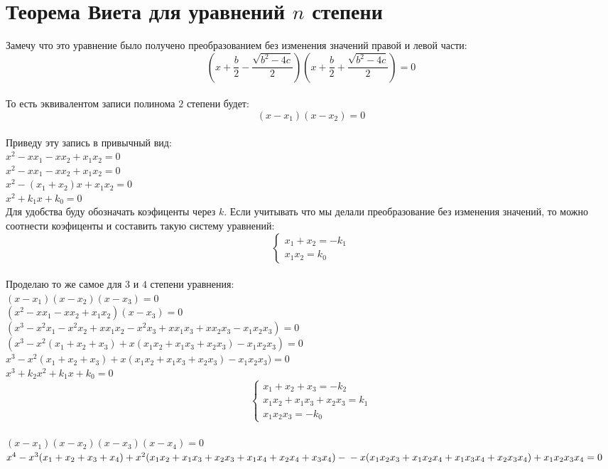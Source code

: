 \documentclass{article} %
\begin{document}
	\section{Теорема Виета для уравнений $n$ степени}{
		Замечу что это уравнение было получено преобразованием без изменения значений правой и левой части:\\
		$$(x+\frac{b}{2}-\frac{\sqrt{b^2-4c}}{2})(x+\frac{b}{2}+\frac{\sqrt{b^2-4c}}{2})=0$$\\
		То есть эквивалентом записи полинома $2$ степени будет:\\
		$$(x-x_1)(x-x_2) = 0$$\\
		Приведу эту запись в привычный вид:\\
		$x^2-xx_1-xx_2+x_1x_2 = 0$\\
		$x^2-xx_1-xx_2+x_1x_2 = 0$\\
		$x^2-(x_1+x_2)x+x_1x_2 = 0$\\
		$x^2+k_1x+k_0=0$\\
		Для удобства буду обозначать коэфиценты через $k$. Если учитывать что мы делали преобразование без изменения значений, то можно соотнести коэфиценты и составить такую систему уравнений:\\
		$$\begin{cases} x_1+x_2 = -k_1\\ x_1x_2 = k_0\end{cases}$$\\
		Проделаю то же самое для $3$ и $4$ степени уравнения:\\
		$(x-x_1)(x-x_2)(x-x_3) = 0$\\
		$(x^2-xx_1-xx_2+x_1x_2)(x-x_3) = 0$\\
		$(x^3-x^2x_1-x^2x_2+xx_1x_2-x^2x_3+xx_1x_3+xx_2x_3-x_1x_2x_3)=0$\\
		$(x^3-x^2(x_1+x_2+x_3)+x(x_1x_2+x_1x_3+x_2x_3)-x_1x_2x_3)=0$\\
		$x^3-x^2(x_1+x_2+x_3)+x(x_1x_2+x_1x_3+x_2x_3)-x_1x_2x_3)=0$\\
		$x^3+k_2x^2+k_1x+k_0 = 0$\\
		$$\begin{cases} x_1+x_2+x_3 = -k_2\\ x_1x_2+x_1x_3+x_2x_3 = k_1\\ x_1x_2x_3=-k_0\end{cases}$$\\
		$(x-x_1)(x-x_2)(x-x_3)(x-x_4) = 0$\\
		$x^4-x^3(x_1+x_2+x_3+x_4)+x^2(x_1x_2+x_1x_3+x_2x_3+x_1x_4+x_2x_4+x_3x_4) - \\ -x(x_1x_2x_3+x_1x_2x_4+x_1x_3x_4+x_2x_3x_4)+x_1x_2x_3x_4 = 0$\\
}
\end{document}
